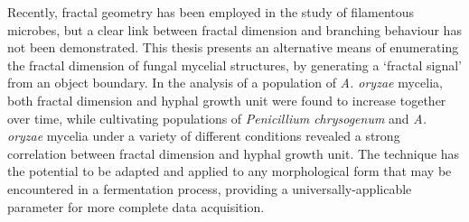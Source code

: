Recently, fractal geometry has been employed in the study of filamentous microbes, but a clear link between fractal dimension and branching behaviour has not been demonstrated. This thesis presents an alternative means of enumerating the fractal dimension of fungal mycelial structures, by generating a \lq fractal signal' from an object boundary. In the analysis of a population of \emph{A. oryzae} mycelia, both fractal dimension and hyphal growth unit were found to increase together over time, while cultivating populations of \emph{Penicillium chrysogenum} and \emph{A. oryzae} mycelia under a variety of different conditions revealed a strong correlation between fractal dimension and hyphal growth unit. The technique has the potential to be adapted and applied to any morphological form that may be encountered in a fermentation process, providing a universally-applicable parameter for more complete data acquisition.